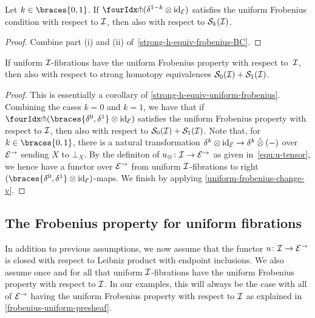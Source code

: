 \documentclass[reqno,10pt,a4paper,oneside,draft]{amsart}
\begin{document}
\begin{corollary} \label{strong-h-equiv-uniform-frobenius}
Let $k \in \braces{0, 1}$.
If $\liftr{(\kcylinv \otimes \id_\catE)}$ satisfies the uniform Frobenius condition with respect to $\cal{I}$, then also with respect to $\cal{S}_k(\cal{I})$.
\end{corollary}

\begin{proof}
Combine part (i) and (ii) of~\cref{strong-h-equiv-frobenius-BC}.
\end{proof}

\begin{proposition} \label{strong-h-equiv-uniform-frobenius-fibrations}
If uniform $\cal{I}$-fibrations have the uniform Frobenius property with respect to~$\cal{I}$, then also with respect to strong homotopy equivalences $\cal{S}_0(\cal{I}) + \cal{S}_1(\cal{I})$.
\end{proposition}

\begin{proof}
This is essentially a corollary of \cref{strong-h-equiv-uniform-frobenius}.
Combining the cases $k = 0$ and $k = 1$, we have that if $\liftr{(\braces{\lcyl, \rcyl} \otimes \id_\catE)}$ satisfies the uniform Frobenius property with respect to $\cal{I}$, then also with respect to $\cal{S}_0(\cal{I}) + \cal{S}_1(\cal{I})$.
Note that, for $k \in \braces{0, 1}$, there is a natural transformation $\delta^k \otimes \id_\catE \to \delta^k \hatotimes (-)$  over $\catE^\to$ sending $X$ to $\bot_X$.
By the definiton of $u_\otimes \co \cal{I} \to \catE^\to$ as given in~\eqref{equ:u-tensor}, we hence have a functor over $\catE^\to$ from uniform $\cal{I}$-fibrations to right $(\braces{\lcyl, \rcyl} \otimes \id_\catE)$-maps.
We finish by applying \cref{uniform-frobenius-change-v}.
\end{proof}

\subsection*{The Frobenius property for uniform fibrations}

In addition to previous assumptions, we now assume that the functor $u \co \cal{I} \to \catE^\to$ is closed with respect to Leibniz product with endpoint inclusions.
We also assume once and for all that uniform $\cal{I}$-fibrations have the uniform Frobenius property with respect to $\cal{I}$.
In our examples, this will always be the case with all of $\catE^\to$ having the uniform Frobenius property with respect to $\cal{I}$ as explained in \cref{frobenius-uniform-presheaf}.
\end{document}
